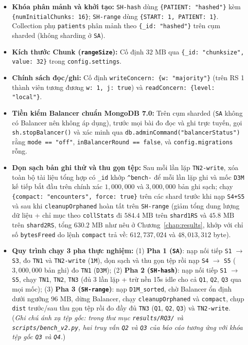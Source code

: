 \begin{itemize}[leftmargin=0.8cm, itemsep=4pt]
  \item \textbf{Khóa phân mảnh và khởi tạo:} \texttt{SH-hash} dùng \texttt{\{PATIENT: "hashed"\}} kèm \texttt{\{numInitialChunks: 16\}}; \texttt{SH-range} dùng \texttt{\{START: 1, PATIENT: 1\}}. Collection phụ \texttt{patients} phân mảnh theo \texttt{\{\_id: "hashed"\}} trên cụm sharded (không sharding ở \texttt{SA}).
  \item \textbf{Kích thước Chunk (\texttt{rangeSize}):} Cố định $32\text{ MB}$ qua \texttt{\{\_id: "chunksize", value: 32\}} trong \texttt{config.settings}.
  \item \textbf{Chính sách đọc/ghi:} Cố định \texttt{writeConcern: \{w: "majority"\}} (trên RS 1 thành viên tương đương \texttt{w: 1, j: true}) và \texttt{readConcern: \{level: "local"\}}.
  \item \textbf{Tiền kiểm Balancer chuẩn MongoDB 7.0:} Trên cụm sharded (\texttt{SA} không có Balancer nên không áp dụng), trước mọi bài đo đọc và ghi trực tuyến, gọi \texttt{sh.stopBalancer()} và xác minh qua \texttt{db.adminCommand("balancerStatus")} rằng \texttt{mode == "off"}, \texttt{inBalancerRound == false}, và \texttt{config.migrations} rỗng.
  \item \textbf{Dọn sạch bản ghi thử và thu gọn tệp:} Sau mỗi lần lặp \texttt{TN2-write}, xóa toàn bộ tài liệu tổng hợp có \texttt{\_id} khớp \texttt{\^{}bench-} để mỗi lần lặp ghi và mốc \texttt{D3M} kế tiếp bắt đầu trên chính xác $1{,}000{,}000$ và $3{,}000{,}000$ bản ghi sạch; chạy \texttt{\{compact: "encounters", force: true\}} trên các shard trước khi nạp \texttt{S4+S5} và sau khi \texttt{cleanupOrphaned} hoàn tất trên \texttt{SH-range} (giảm tổng dung lượng dữ liệu + chỉ mục theo \texttt{collStats} đi $584.4\text{ MB}$ trên \texttt{shard1RS} và $45.8\text{ MB}$ trên \texttt{shard2RS}, tổng $630.2\text{ MB}$ như nêu ở Chương~\ref{chap:results}, khớp với chỉ số \texttt{bytesFreed} do lệnh \texttt{compact} trả về: $612{,}737{,}024$ và $48{,}013{,}312$ byte).
  \item \textbf{Quy trình chạy 3 pha thực nghiệm:} (1) \textbf{Pha 1 (\texttt{SA})}: nạp nối tiếp \texttt{S1} $\rightarrow$ \texttt{S3}, đo \texttt{TN1} và \texttt{TN2-write} (\texttt{1M}), dọn sạch và thu gọn tệp rồi nạp \texttt{S4} $\rightarrow$ \texttt{S5} ($3{,}000{,}000$ bản ghi) đo \texttt{TN1} (\texttt{D3M}); (2) \textbf{Pha 2 (\texttt{SH-hash})}: nạp nối tiếp \texttt{S1} $\rightarrow$ \texttt{S5}, chạy \texttt{TN1}, \texttt{TN2}, \texttt{TN3} (đủ 3 lần lặp + trừ nền 15s idle cho cả \texttt{Q1}, \texttt{Q2}, \texttt{Q3} qua mọi mốc); (3) \textbf{Pha 3 (\texttt{SH-range})}: nạp \texttt{D1M\_sorted}, chờ Balancer ổn định dưới ngưỡng $96\text{ MB}$, dừng Balancer, chạy \texttt{cleanupOrphaned} và \texttt{compact}, chụp \texttt{dist} trước/sau thu gọn tệp rồi đo đầy đủ \texttt{TN3} (\texttt{Q1}, \texttt{Q2}, \texttt{Q3}) và \texttt{TN2-write}. (\textit{Ghi chú ánh xạ tệp gốc: trong thư mục \texttt{results/RQ3/} và \texttt{scripts/bench\_v2.py}, hai truy vấn \texttt{Q2} và \texttt{Q3} của báo cáo tương ứng với khóa tệp gốc \texttt{Q3} và \texttt{Q4}.})
\end{itemize}

